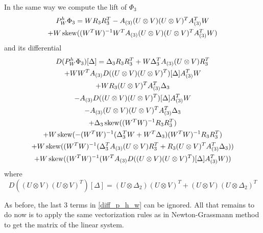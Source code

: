In the same way we compute the lift of $\Phi_3$
\begin{multline}
 P^h_W \Phi_3 = W R_3 R_3^T - A_{(3)} (U \otimes V) (U \otimes V)^T A_{(3)}^T W  \\
 + W \operatorname*{skew}( (W^T W)^{-1} W^T A_{(3)} (U \otimes V)(U \otimes V)^T A_{(3)}^T W )
 \end{multline}
and its differential
\begin{multline}
\label{diff_p_h_w}
 D(P^h_W \Phi_3) [ \Delta ] = \Delta_3 R_3 R_3^T + W \Delta_3^T A_{(3)} (U \otimes V) R_3^T  \\
 + W W^T A_{(3)} D ( ( U \otimes V)(U \otimes V)^T ) [\Delta] A_{(3)}^T W \\
+ W R_3 (U \otimes V)^T A_{(3)}^T \Delta_3  \\
 - A_{(3)} D ( ( U \otimes V)(U \otimes V)^T ) [\Delta] A_{(3)}^T W \\
-  A_{(3)}  ( U \otimes V)(U \otimes V)^T A_{(3)}^T \Delta_3 \\
+ \Delta_3 \operatorname*{skew} ( (W^T W)^{-1} R_3 R_3^T ) \\
+ W \operatorname*{skew} ( - (W^T W)^{-1} ( \Delta_3^T W + W^T \Delta_3) (W^T W)^{-1} R_3 R_3^T) \\
+  W \operatorname*{skew} ( (W^T W)^{-1} ( \Delta_3^T A_{(3)} ( U \otimes V) R_3^T + R_3 (U \otimes V)^T A_{(3)}^T \Delta_3 ) ) \\
+  W \operatorname*{skew} ( (W^T W)^{-1} ( W^T A_{(3)} D ( ( U \otimes V)(U \otimes V)^T)[\Delta]  A_{(3)}^T W ) ) 
\end{multline}
where
\begin{equation}
 D( ( U \otimes V)(U \otimes V)^T ) [\Delta] = ( U \otimes \Delta_2 )(U \otimes V)^T + ( U \otimes V)  ( U \otimes \Delta_2 )^T 
\end{equation}


As before, the last $3$ terms in \eqref{diff_p_h_w} can be ignored. All that remains to do now
is to apply the same vectorization rules as in Newton-Grassmann method to get the matrix of the linear system.

